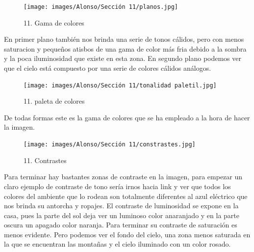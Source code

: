 \documentclass[12pt]{article}
\begin{document}
        \begin{figure}[H]
      \centering
      \texttt{[image: images/Alonso/Sección 11/planos.jpg]}
      \caption{\small 11. Gama de colores}
    \end{figure}
    En primer plano también nos brinda una serie de tonos cálidos, pero con menos saturacion y pequeños atisbos de una gama de color más fria debido a la sombra y la poca iluminosidad que existe en esta zona. En segundo plano  podemos ver que el cielo está compuesto por una serie de colores cálidos análogos.

    \begin{figure}[H]
      \centering
      \texttt{[image: images/Alonso/Sección 11/tonalidad paletil.jpg]}
      \caption{\small 11. paleta de colores}
    \end{figure}

    De todas formas este es la gama de colores que se ha empleado a la hora de hacer la imagen.

\begin{figure}[H]
      \centering
      \texttt{[image: images/Alonso/Sección 11/constrastes.jpg]}
      \caption{\small 11. Contrastes}
    \end{figure}
    Para terminar hay bastantes zonas de contraste en la imagen, para empezar un claro ejemplo de contraste de tono sería irnos hacia link y ver que todos los colores del ambiente que lo rodean son totalmente diferentes al azul eléctrico que nos brinda su antorcha y ropajes. El contraste de luminosidad se expone en la casa, pues la parte del sol deja ver un luminoso color anaranjado y en la parte oscura un apagado color naranja. Para terminar su contraste de saturación es menos evidente. Pero podemos ver el fondo del cielo, una zona menos saturada en la que se encuentran las montañas y el cielo iluminado con un color rosado.
        \newpage

\end{document}
